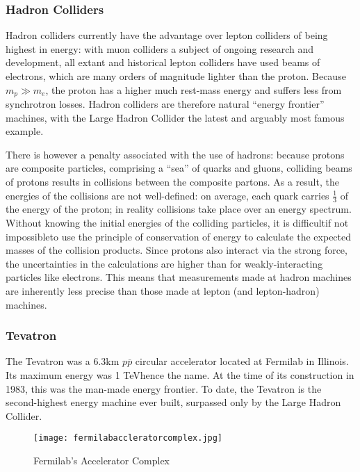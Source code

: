 \subsubsection{Hadron Colliders}
Hadron colliders currently have the advantage over lepton colliders of being highest in energy: with muon colliders a subject of ongoing research and development\cite{Fermi:Muon:Online}, all extant and historical lepton colliders have used beams of electrons, which are many orders of magnitude lighter than the proton. Because $m_{p}\gg m_{e}$, the proton has a higher much rest-mass energy and suffers less from synchrotron losses. Hadron colliders are therefore natural ``energy frontier'' machines, with the Large Hadron Collider the latest and arguably most famous example.

There is however a penalty associated with the use of hadrons: because protons are composite particles, comprising a ``sea'' of quarks and gluons, colliding beams of protons results in collisions between the composite partons. As a result, the energies of the collisions are not well-defined: on average, each quark carries $\frac{1}{3}$ of the energy of the proton; in reality collisions take place over an energy spectrum. Without knowing the initial energies of the colliding particles, it is difficult\textemdash if not impossible\textemdash to use the principle of conservation of energy to calculate the expected masses of the collision products\cite{Butterworth:Interview}. Since protons also interact via the strong force, the uncertainties in the calculations are higher than for weakly-interacting particles like electrons\cite{Thorne:Interview}. This means that measurements made at hadron machines are inherently less precise than those made at lepton (and lepton-hadron) machines.
\subsubsection{Tevatron}
The Tevatron was a 6.3km $p\overline{p}$ circular accelerator located at Fermilab in Illinois. Its maximum energy was 1 TeV\textemdash hence the name. At the time of its construction in 1983, this was the man-made energy frontier. To date, the Tevatron is the second-highest energy machine ever built, surpassed only by the Large Hadron Collider.

\begin{figure}
\centering
\texttt{[image: fermilabaccleratorcomplex.jpg]}
\caption{Fermilab's Accelerator Complex\cite{Tevatron:Antiprotons:Online}}
\end{figure}

